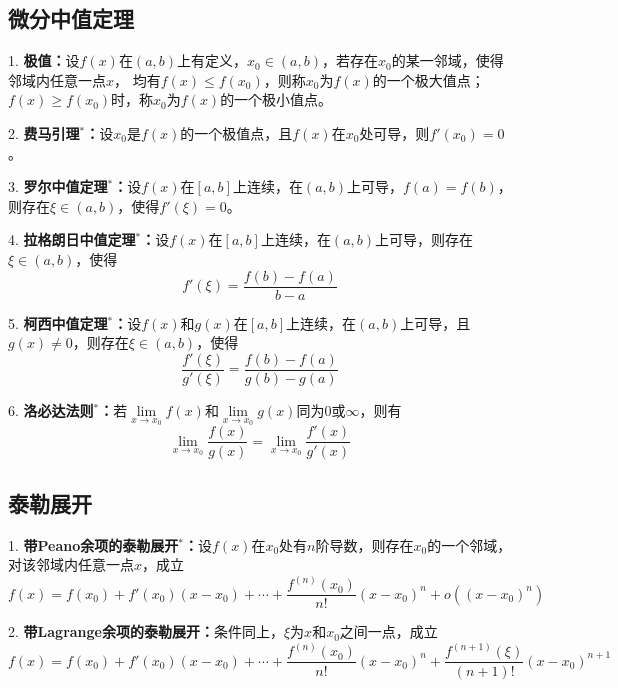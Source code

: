 \subsection{微分中值定理}

1. \textbf{极值：}设$f(x)$在$(a,b)$上有定义，$x_0\in(a,b)$，若存在$x_0$的某一邻域，使得邻域内任意一点$x$，
均有$f(x)\leqslant f(x_0)$，则称$x_0$为$f(x)$的一个极大值点；$f(x)\geqslant f(x_0)$时，称$x_0$为$f(x)$的一个极小值点。

2. \textbf{费马引理$^*$：}设$x_0$是$f(x)$的一个极值点，且$f(x)$在$x_0$处可导，则$f'(x_0)=0$。

3. \textbf{罗尔中值定理$^*$：}设$f(x)$在$[a,b]$上连续，在$(a,b)$上可导，$f(a)=f(b)$，则存在$\xi \in (a,b)$，使得$f'(\xi)=0$。

4. \textbf{拉格朗日中值定理$^*$：}设$f(x)$在$[a,b]$上连续，在$(a,b)$上可导，则存在$\xi \in (a,b)$，使得
\begin{equation*}
    f'(\xi)=\frac{f(b)-f(a)}{b-a}
\end{equation*}

5. \textbf{柯西中值定理$^*$：}设$f(x)$和$g(x)$在$[a,b]$上连续，在$(a,b)$上可导，且$g(x)\neq 0$，则存在$\xi \in (a,b)$，使得
\begin{equation*}
    \frac{f'(\xi)}{g'(\xi)}=\frac{f(b)-f(a)}{g(b)-g(a)}
\end{equation*}

6. \textbf{洛必达法则$^*$：}若$\lim\limits_{x\rightarrow x_0} f(x)$和$\lim\limits_{x\rightarrow x_0} g(x)$同为$0$或$\infty$，则有
\begin{equation*}
    \lim\limits_{x\rightarrow x_0} \frac{f(x)}{g(x)}=\lim\limits_{x\rightarrow x_0} \frac{f'(x)}{g'(x)}
\end{equation*}

\subsection{泰勒展开}

1. \textbf{带Peano余项的泰勒展开$^*$：}设$f(x)$在$x_0$处有$n$阶导数，则存在$x_0$的一个邻域，对该邻域内任意一点$x$，成立
\begin{equation*}
    f(x)=f(x_0)+f'(x_0)(x-x_0)+\cdots+\frac{f^{(n)}(x_0)}{n!}(x-x_0)^n+o\left((x-x_0)^n\right)
\end{equation*}

2. \textbf{带Lagrange余项的泰勒展开：}条件同上，$\xi$为$x$和$x_0$之间一点，成立
\begin{equation*}
    f(x)=f(x_0)+f'(x_0)(x-x_0)+\cdots+\frac{f^{(n)}(x_0)}{n!}(x-x_0)^n+\frac{f^{(n+1)}(\xi)}{(n+1)!}(x-x_0)^{n+1}
\end{equation*}

